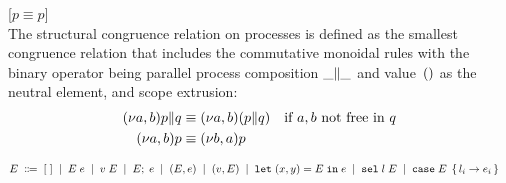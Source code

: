 [$p \equiv p$]\medskip\\
The structural congruence relation on processes is defined as the smallest
congruence relation that includes the commutative monoidal rules with the
binary operator being parallel process composition $\PPar \_ \_$ and
value~$()$ as the neutral element, and scope extrusion:
\begin{align*}
  \PPar{\PScope p}{q} &\equiv \PScope (\PPar p q)
  \quad\text{if $a,b$ not free in $q$}
  \\
  \PScope p &\equiv \PScope[b,a] p
\end{align*}

\begin{align*}
  E \; \Coloneqq \;\;&
    [\;] \; \mid \;
    E \; e \; \mid \;
    v \; E \; \mid \;
    E;\; e \; \mid \;
    (E,e) \; \mid \;
    (v,E) \; \mid \;
    \mathtt{let}\; (x,y) = E \;\mathtt{in}\; e \; \mid \;
    \mathtt{sel}\; l \; E \; \mid \; 
    \mathtt{case}\; E \; \left\{\,  l_i \rightarrow e_i  \,\right\}
\end{align*}



% 
